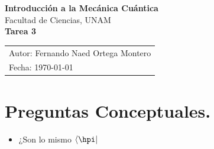 \documentclass[12pt,a4paper]{article}
\begin{document}
\begin{center}
    {\LARGE \textbf{Introducción a la Mecánica Cuántica}} \\[0.4cm]

    {\large Facultad de Ciencias, UNAM} \\[0.6cm]

    \large \textbf{Tarea 3} \\[0.2cm]

    \begin{tabular}{l}
        \small Autor: Fernando Naed Ortega Montero\\
        \small Fecha: \today
    \end{tabular}
\end{center}



\section*{Preguntas Conceptuales.}

\begin{itemize}

\item ¿Son lo mismo $\bra{\hpi}$

\end{itemize}
\end{document}
